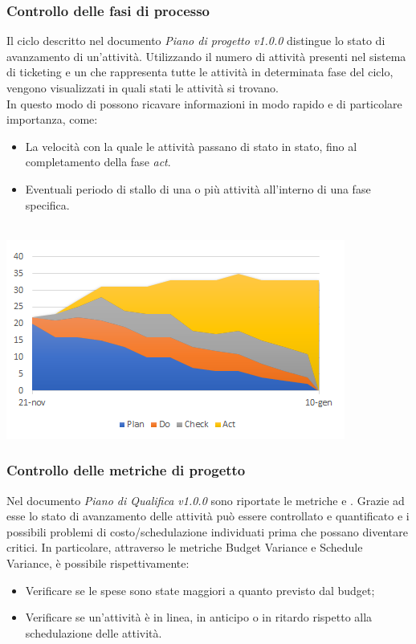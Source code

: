 \subsubsection{Controllo delle fasi di processo}
Il ciclo  descritto nel documento \emph{Piano di progetto v1.0.0} distingue lo stato di avanzamento di un'attività. Utilizzando il numero di attività presenti nel sistema di ticketing e un  che rappresenta tutte le attività in determinata fase del ciclo, vengono visualizzati in quali stati le attività si trovano. \\
In questo modo di possono ricavare informazioni in  modo rapido e di particolare importanza, come:
\begin{itemize}
\item{La velocità con la quale le attività passano di stato in stato, fino al completamento della fase \emph{act}.}
\item{Eventuali periodo di stallo di una o più attività all'interno di una fase specifica.} \\ \\
\end{itemize}  
\centerline {\includegraphics[scale=1]{../PianoDiProgetto/Img/Grafico_PDCA.png}}
\subsubsection{Controllo delle metriche di progetto}
Nel documento \emph{Piano di Qualifica v1.0.0} sono riportate le metriche  e . Grazie ad esse lo stato di avanzamento delle attività può essere controllato e quantificato e i possibili problemi di costo/schedulazione individuati prima che possano diventare critici. In particolare, attraverso le metriche Budget Variance e Schedule Variance, è possibile rispettivamente:
\begin{itemize}
\item{Verificare se le spese sono state maggiori a quanto previsto dal budget;}
\item{Verificare se un'attività è in linea, in anticipo o in ritardo rispetto alla schedulazione delle attività.}
\end{itemize}

